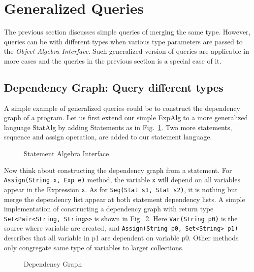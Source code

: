 \section{Generalized Queries}\label{sec:generalizedQueries}
The previous section discusses simple queries of merging the same type. However, queries can be with different types when various type parameters are passed to the \textit{Object Algebra Interface}. Such generalized version of queries are applicable in more cases and the queries in the previous section is a special case of it. 

\subsection{Dependency Graph: Query different types}\label{subsec:depGraph}
A simple example of generalized queries could be to construct the dependency graph of a program. Let us first extend our simple ExpAlg to a more generalized language StatAlg by adding Statements as in Fig.~\ref{statalg}. Two more statements, sequence and assign operation, are added to our statement language. 

\begin{figure}[tb]
\vspace{-.1in}
\caption{Statement Algebra Interface}
\label{statalg}
\end{figure}

Now think about constructing the dependency graph from a statement. For \lstinline{Assign(String x, Exp e)} method, the variable \lstinline{x} will depend on all variables appear in the Expression \lstinline{x}. As for \lstinline{Seq(Stat s1, Stat s2)}, it is nothing but merge the dependency list appear at both statement dependency lists. A simple implementation of constructing a dependency graph with return type \lstinline{Set<Pair<String, String>>} is shown in Fig.~\ref{deps1}. Here \lstinline{Var(String p0)} is the source where variable are created, and \lstinline{Assign(String p0, Set<String> p1)} describes that all variable in p1 are dependent on variable p0. Other methods only congregate same type of variables to larger collections. 

\begin{figure}[tb]
\vspace{-.1in}
\caption{Dependency Graph}
\label{deps1}
\end{figure}

